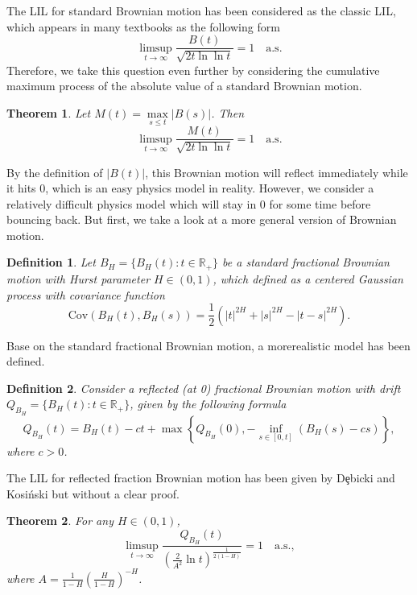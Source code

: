 \documentclass{article}
\newtheorem{thm}{\sc Theorem}
\newtheorem{defin}{\sc Definition}
\begin{document}
\begin{CJK*}{UTF8}{bsmi}
The LIL for standard Brownian motion has been considered as the classic LIL, which appears in many textbooks as the following form
\begin{equation}
\limsup\limits_{t\rightarrow \infty} \frac{B(t)}{\sqrt{2t \ln \ln t}} = 1\quad \mathrm{a.s.}
\end{equation}
Therefore, we take this question even further by considering the cumulative maximum process of the absolute value of a standard Brownian motion.
\begin{thm}
\label{LIL_mabm}
    Let $M(t) = \max\limits_{s\leqslant t}{|B(s)|}$. Then
    $$\limsup\limits_{t\rightarrow \infty} \frac{M(t)}{\sqrt{2t \ln \ln t}} = 1\quad \mathrm{a.s.}$$
\end{thm}

By the definition of $|B(t)|$, this Brownian motion will reflect immediately while it hits 0, which is an easy physics model in reality. However, we consider a relatively difficult physics model which will stay in 0 for some time before bouncing back. But first, we take a look at a more general version of Brownian motion.

\begin{defin}
\label{fbm}
    Let $B_H = \{B_H(t):t \in \mathbb{R}_+ \}$ be a standard fractional Brownian motion with Hurst parameter $H \in (0,1)$, which defined as a centered Gaussian process with covariance function
    $$\mbox{Cov}(B_H(t),B_H(s)) = \frac{1}{2}\left(|t|^{2H}+|s|^{2H}-|t-s|^{2H}\right).$$
\end{defin}

Base on the standard fractional Brownian motion, a morerealistic model has been defined.

\begin{defin}
\label{rfbm}
    Consider a reflected (at 0) fractional Brownian motion with drift $Q_{B_{H}}= \{B_H(t):t \in \mathbb{R_+} \}$, given by the following formula
    $$Q_{B_{H}}(t)=B_H(t)-ct+\max\left\{Q_{B_{H}}(0),-\inf\limits_{s\in [0,t]}(B_H(s)-cs)\right\},$$
    where $c>0$.
\end{defin}

The LIL for reflected fraction Brownian motion has been given by D{\c e}bicki and Kosi{\'n}ski \citep{almostsurelyconvergence} but without a clear proof.

\begin{thm}
\label{LIL_rfbm}
    For any $H \in (0, 1)$,
    $$\limsup\limits_{t\rightarrow \infty} \frac{Q_{B_{H}}(t)}{(\frac{2}{A^2}\ln{t})^{\frac{1}{2(1-H)}}} = 1 \quad \mathrm{a.s.},$$
    where $A = \frac{1}{1-H}(\frac{H}{1-H})^{-H}$.
\end{thm}


\end{CJK*}
\end{document}
